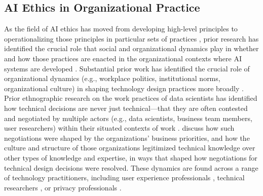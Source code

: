 \documentclass[acmsmall]{acmart}
\begin{document}
\subsection{AI Ethics in Organizational Practice}
As the field of AI ethics has moved from developing high-level principles \cite{Jobin:2019bw} to operationalizing those principles in particular sets of practices \cite{Mittelstadt:2019ve, schiff2020principles}, prior research has identified the crucial role that social and organizational dynamics play in whether and how those practices are enacted in the organizational contexts where AI systems are developed \cite{Metcalf2019OwningEthics, madaio2020co, rakova2021responsible}. Substantial prior work has identified the crucial role of organizational dynamics (e.g., workplace politics, institutional norms, organizational culture)  in shaping technology design practices more broadly \cite{suchman2002located, wong2021tactics, shilton2013values, neff2020bad}. Prior ethnographic research on the work practices of data scientists has identified how technical decisions are never just technical---that they are often contested and negotiated by multiple actors (e.g., data scientists, business team members, user researchers) within their situated contexts of work \cite{passi2019problem,passi2018trust}. \citet{passi2020making} discuss how such negotiations were shaped by the organizations' business priorities, and how the culture and structure of those organizations legitimized technical knowledge over other types of knowledge and expertise, in ways that shaped how negotiations for technical design decisions were resolved. These dynamics are found across a range of technology practitioners, including user experience professionals \cite{wong2021tactics, Chivukula2020DimensionsUX}, technical researchers \cite{shilton2013values}, or privacy professionals \cite{Bamberger2015PrivacyGround}.

\end{document}
